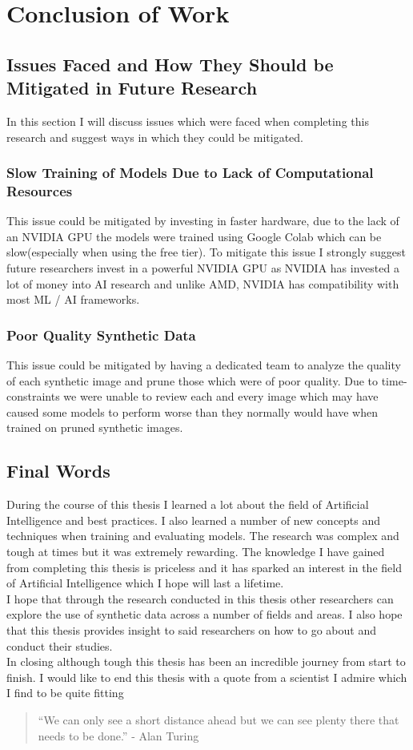\section{Conclusion of Work}
\subsection{Issues Faced and How They Should be Mitigated in Future Research}
In this section I will discuss issues which were faced when completing this research and suggest ways in which they could be mitigated.
\subsubsection{Slow Training of Models Due to Lack of Computational Resources}
This issue could be mitigated by investing in faster hardware, due to the lack of an NVIDIA GPU the models were trained using Google Colab which can be slow(especially when using the free tier).  To mitigate this issue I strongly suggest future researchers invest in a powerful NVIDIA GPU as NVIDIA has invested a lot of money into AI research and unlike AMD, NVIDIA has compatibility with most ML / AI frameworks.
\subsubsection{Poor Quality Synthetic Data}
This issue could be mitigated by having a dedicated team to analyze the quality of each synthetic image and prune those which were of poor quality.  Due to time-constraints we were unable to review each and every image which may have caused some models to perform worse than they normally would have when trained on pruned synthetic images.
\subsection{Final Words}
During the course of this thesis I learned a lot about the field of Artificial Intelligence and best practices.  I also learned a number of new concepts and techniques when training and evaluating models.  The research was complex and tough at times but it was extremely rewarding.  The knowledge I have gained from completing this thesis is priceless and it has sparked an interest in the field of Artificial Intelligence which I hope will last a lifetime. 
\\
I hope that through the research conducted in this thesis other researchers can explore the use of synthetic data across a number of fields and areas.  I also hope that this thesis provides insight to said researchers on how to go about and conduct their studies.
\\
In closing although tough this thesis has been an incredible journey from start to finish.  I would like to end this thesis with a quote from a scientist I admire which I find to be quite fitting \begin{quote}``We can only see a short distance ahead but we can see plenty there that needs to be done.'' - Alan Turing\end{quote}